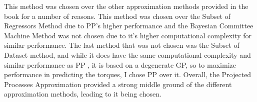 \documentclass{article}
\begin{document}
    This method was chosen over the other approximation methods provided in the book for a number
    of reasons. This method was chosen over the Subset of Regressors Method due to PP's higher
    performance and the Bayesian Committee Machine Method was not chosen due to it's higher
    computational complexity for similar performance. The last method that was not chosen was the
    Subset of Dataset method, and while it does have the same computational complexity and similar
    performance as PP \citep{gpml}, it is based on a degenerate GP, so to maximize performance in
    predicting the torques, I chose PP over it. Overall, the Projected Processes Approximation
    provided a strong middle ground of the different approximation methods, leading to it being
    chosen.
    
    \clearpage
    
    
\end{document}
